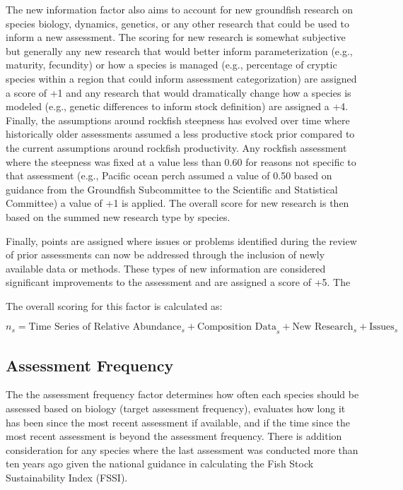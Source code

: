 \documentclass[11pt,
  english,
  a4paper,
]{article}
\begin{document}
The new information factor also aims to account for new groundfish research on species biology, dynamics, genetics, or any other research that could be used to inform a new assessment. The scoring for new research is somewhat subjective but generally any new research that would better inform parameterization (e.g., maturity, fecundity) or how a species is managed (e.g., percentage of cryptic species within a region that could inform assessment categorization) are assigned a score of +1 and any research that would dramatically change how a species is modeled (e.g., genetic differences to inform stock definition) are assigned a +4. Finally, the assumptions around rockfish steepness has evolved over time where historically older assessments assumed a less productive stock prior compared to the current assumptions around rockfish productivity. Any rockfish assessment where the steepness was fixed at a value less than 0.60 for reasons not specific to that assessment (e.g., Pacific ocean perch assumed a value of 0.50 based on guidance from the Groundfish Subcommittee to the Scientific and Statistical Committee) a value of +1 is applied. The overall score for new research is then based on the summed new research type by species.

Finally, points are assigned where issues or problems identified during the review of prior assessments can now be addressed through the inclusion of newly available data or methods. These types of new information are considered significant improvements to the assessment and are assigned a score of +5. The

The overall scoring for this factor is calculated as:

\[
n_s = \text{Time Series of Relative Abundance}_s + \text{Composition Data}_s + \text{New Research}_s +  \text{Issues}_s
\]

\hypertarget{assessment-frequency}{%
\subsection{Assessment Frequency}\label{assessment-frequency}}

The the assessment frequency factor determines how often each species should be assessed based on biology (target assessment frequency), evaluates how long it has been since the most recent assessment if available, and if the time since the most recent assessment is beyond the assessment frequency. There is addition consideration for any species where the last assessment was conducted more than ten years ago given the national guidance in calculating the Fish Stock Sustainability Index (FSSI).
\end{document}
